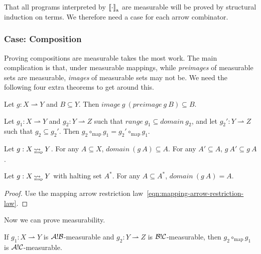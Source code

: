 \documentclass[preprint]{sigplanconf}
\newcommand{\arrow}{\rightsquigarrow}
\newcommand{\pto}{\rightharpoonup}
\newcommand{\gen}{_\mathrm{a}}
\newcommand{\map}{_\mathrm{map}}
\DeclareMathOperator{\mapto}{\arrow_{\mspace{-21mu}\map}}
\begin{document}
That all programs interpreted by $\meaningof{\cdot}\gen$ are measurable will be proved by structural induction on terms.
We therefore need a case for each arrow combinator.

\subsubsection{Case: Composition}

Proving compositions are measurable takes the most work.
The main complication is that, under measurable mappings, while \emph{preimages} of measurable sets are measurable, \emph{images} of measurable sets may not be.
We need the following four extra theorems to get around this.

\begin{lemma}
Let $g : X \pto Y$ and $B \subseteq Y$. Then $image~g~(preimage~g~B) \subseteq B$.
\label{lem:images-of-preimages}
\end{lemma}

\begin{lemma}
Let $g_1 : X \pto Y$ and $g_2 : Y \pto Z$ such that $range~g_1 \subseteq domain~g_2$, and let $g_2' : Y \pto Z$ such that $g_2 \subseteq g_2'$.
Then $g_2 \circ\map g_1 = g_2' \circ\map g_1$.
\label{lem:composition-expansion}
\end{lemma}

\begin{theorem}
Let $g : X \mapto Y$.
For any $A \subseteq X$, $domain~(g~A) \subseteq A$.
For any $A' \subseteq A$, $g~A' \subseteq g~A$.
\label{thm:mapping-arrow-monotonicity}
\end{theorem}
\begin{theorem}
Let $g : X \mapto Y$ with halting set $A^*$. For any $A \subseteq A^*$, $domain~(g~A) = A$.
\label{thm:halting-subsets}
\end{theorem}
\begin{proof}
Use the mapping arrow restriction law~\eqref{eqn:mapping-arrow-restriction-law}.
\end{proof}

Now we can prove measurability.

\begin{lemma}[measurability under $\circ\map$]
If $g_1 : X \pto Y$ is $\mathcal{A}!\mathcal{B}$-measurable and $g_2 : Y \pto Z$ is $\mathcal{B}!\mathcal{C}$-measurable, then $g_2 \circ\map g_1$ is $\mathcal{A}!\mathcal{C}$-measurable.
\label{lem:compositions-are-measurable}
\end{lemma}
\end{document}

